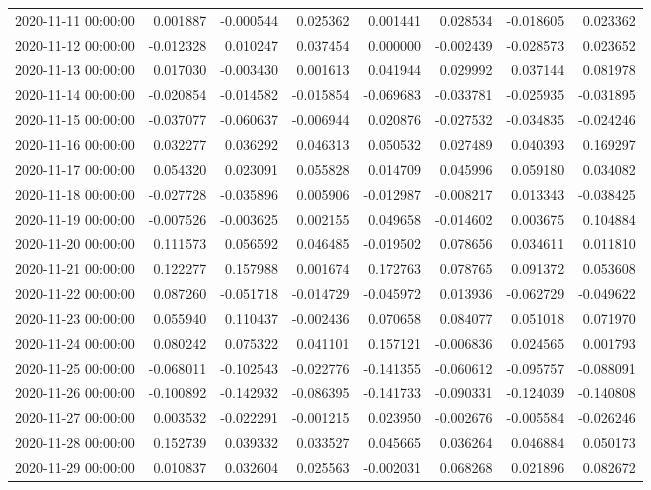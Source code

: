 \begin{tabular}{lrrrrrrr}
2020-11-11 00:00:00 & 0.001887 & -0.000544 & 0.025362 & 0.001441 & 0.028534 & -0.018605 & 0.023362 \\
2020-11-12 00:00:00 & -0.012328 & 0.010247 & 0.037454 & 0.000000 & -0.002439 & -0.028573 & 0.023652 \\
2020-11-13 00:00:00 & 0.017030 & -0.003430 & 0.001613 & 0.041944 & 0.029992 & 0.037144 & 0.081978 \\
2020-11-14 00:00:00 & -0.020854 & -0.014582 & -0.015854 & -0.069683 & -0.033781 & -0.025935 & -0.031895 \\
2020-11-15 00:00:00 & -0.037077 & -0.060637 & -0.006944 & 0.020876 & -0.027532 & -0.034835 & -0.024246 \\
2020-11-16 00:00:00 & 0.032277 & 0.036292 & 0.046313 & 0.050532 & 0.027489 & 0.040393 & 0.169297 \\
2020-11-17 00:00:00 & 0.054320 & 0.023091 & 0.055828 & 0.014709 & 0.045996 & 0.059180 & 0.034082 \\
2020-11-18 00:00:00 & -0.027728 & -0.035896 & 0.005906 & -0.012987 & -0.008217 & 0.013343 & -0.038425 \\
2020-11-19 00:00:00 & -0.007526 & -0.003625 & 0.002155 & 0.049658 & -0.014602 & 0.003675 & 0.104884 \\
2020-11-20 00:00:00 & 0.111573 & 0.056592 & 0.046485 & -0.019502 & 0.078656 & 0.034611 & 0.011810 \\
2020-11-21 00:00:00 & 0.122277 & 0.157988 & 0.001674 & 0.172763 & 0.078765 & 0.091372 & 0.053608 \\
2020-11-22 00:00:00 & 0.087260 & -0.051718 & -0.014729 & -0.045972 & 0.013936 & -0.062729 & -0.049622 \\
2020-11-23 00:00:00 & 0.055940 & 0.110437 & -0.002436 & 0.070658 & 0.084077 & 0.051018 & 0.071970 \\
2020-11-24 00:00:00 & 0.080242 & 0.075322 & 0.041101 & 0.157121 & -0.006836 & 0.024565 & 0.001793 \\
2020-11-25 00:00:00 & -0.068011 & -0.102543 & -0.022776 & -0.141355 & -0.060612 & -0.095757 & -0.088091 \\
2020-11-26 00:00:00 & -0.100892 & -0.142932 & -0.086395 & -0.141733 & -0.090331 & -0.124039 & -0.140808 \\
2020-11-27 00:00:00 & 0.003532 & -0.022291 & -0.001215 & 0.023950 & -0.002676 & -0.005584 & -0.026246 \\
2020-11-28 00:00:00 & 0.152739 & 0.039332 & 0.033527 & 0.045665 & 0.036264 & 0.046884 & 0.050173 \\
2020-11-29 00:00:00 & 0.010837 & 0.032604 & 0.025563 & -0.002031 & 0.068268 & 0.021896 & 0.082672 \\

\end{tabular}
